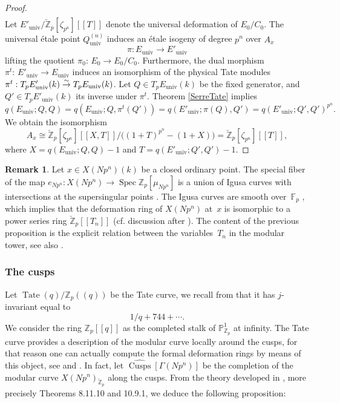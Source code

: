 \documentclass[11pt]{article}
\newcommand{\cf}{cf.\xspace}
\newcommand\To[1]{\mathchoice{\xrightarrow{\textstyle\kern4pt#1\kern3pt}}{\stackrel{#1}{\to}}{}{}}
\newcommand{\lcr}{[\![}
\newcommand{\rcr}{]\!]}
\newcommand{\lpr}{(\!(}
\newcommand{\rpr}{)\!)}
\newcommand{\univ}{\mathrm{univ}}
\numberwithin{equation}{section}
\theoremstyle{definition}
\newtheorem{remark}[prop]{Remark}
\newcommand{\bb}[1]{\mathbb{#1}}
\DeclareMathOperator{\Spec}{Spec}
\DeclareMathOperator{\Cusps}{Cusps}
\DeclareMathOperator{\Tate}{Tate}
\newcommand{\mc}[1]{X(Np^{#1})}
\begin{document}
\begin{proof}
\begin{multline*}
\end{multline*}
Let $E'_{\univ}/\breve{\bb{Z}}_p[\zeta_{p^n}]\lcr T\rcr$ denote the universal deformation of $E_0/C_0$. The universal étale point $Q_{\univ}^{(n)}$ induces an étale isogeny of degree $p^n$ over $A_{x}$
\[
\pi: E_{\univ}\to E'_{\univ}
\]
lifting the quotient $\pi_0{:}\,E_0\!\to\!E_0/C_0$. Furthermore, the dual morphism \hbox{$\pi^t{:}\,E'_{\univ}\!\to\!E_{\univ}$} induces an isomorphism of the physical Tate modules $\pi^{t}: T_pE'_{\univ}(k)\To{\sim} T_p E_{\univ}(k)$. Let $Q\in T_{p} E_{\univ}(k)$ be the fixed generator, and $Q'\in T_{p} E'_{\univ}(k)$ its inverse under $\pi^t$. Theorem \ref{SerreTate} implies
\[
q(E_{\univ}; Q,Q)=q(E_{\univ}; Q,\pi^{t}(Q'))=q(E'_{\univ};\pi(Q), Q')=q(E'_{\univ};Q',Q')^{p^n}.
\]
We obtain the isomorphism
\[
A_{x}\cong \breve{\bb{Z}}_p[\zeta_{p^n}]\lcr X, T\rcr/\bigl((1+T)^{p^n}-(1+X)\bigr)=\breve{\bb{Z}}_p[\zeta_{p^n}]\lcr T\rcr,
\]
where $X=q(E_{\univ};Q,Q)-1$ and $T=q(E'_{\univ}; Q',Q')-1$.
\end{proof}

\begin{remark}
Let $x\in X(Np^n)(k)$ be a closed ordinary point. The special fiber of the map $e_{Np^n}: X(Np^n)\to \Spec \bb{Z}_p[\mu_{Np^n}]$ is a union of Igusa curves with intersections at the supersingular points \cite[Th.\,13.10.3]{katz1985arithmetic}. The Igusa curves are smooth over~$\bb{F}_p$ \cite[Th.\,12.6.1]{katz1985arithmetic}, which implies that the deformation ring of $X(Np^n)$ at~$x$ is isomorphic to a power series ring $\breve{\bb{Z}}_p\lcr T_n\rcr$ (\cf discussion after \cite[Rem.\,3.4.4]{WeinsteinModinfinite}). The content of the previous proposition is the explicit relation between the variables~$T_n$ in the modular tower, see also \cite[Prop.\,2.2]{JacobFullLevel2019}.
\end{remark}

\subsubsection*{The cusps}

Let $\Tate(q)/\bb{Z}_p\lpr q\rpr$ be the Tate curve, we recall from \!\cite[Ch.\,8.8]{katz1985arithmetic} that it has $j$-invariant equal to
\[1/q+744+\cdots.\]
We consider the ring $\bb{Z}_p\lcr q\rcr$ as the completed stalk of $\bb{P}^1_{\bb{Z}_p}$ at infinity. The Tate curve provides a description of the modular curve locally around the cusps, for that reason one can actually compute the formal deformation rings by means of this object, see \cite{katz1985arithmetic} and \cite{deligne1973schemas}. In fact, let $\widehat{\Cusps}[\Gamma(Np^n)]$ be the completion of the modular curve $\mc{n}_{\breve{\bb{Z}}_p}$ along the cusps. From the theory developed in \cite[Ch.\,8\,\&\,10]{katz1985arithmetic}, more precisely Theorems 8.11.10 and 10.9.1, we deduce the following proposition:
\end{document}
